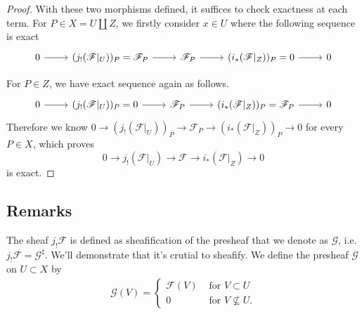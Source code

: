 \begin{proof}
With these two morphisms defined, it suffices to check exactness at each term. 
For $P\in X=U\amalg Z$, we firstly consider $x\in U$ where the following sequence is exact 
\[\begin{tikzcd}
	0 & {(j_!(\mathscr F\vert_U))_P=\mathscr F_P} & {\mathscr F_P} & {(i_{\ast}(\mathscr F\vert_Z))_P=0} & 0
	\arrow[from=1-1, to=1-2]
	\arrow[from=1-2, to=1-3]
	\arrow[from=1-3, to=1-4]
	\arrow[from=1-4, to=1-5]
\end{tikzcd}\]

For $P\in Z$, we have exact sequence again as follows.
\[\begin{tikzcd}
	0 & {(j_!(\mathscr F\vert_U))_P=0} & {\mathscr F_P} & {(i_{\ast}(\mathscr F\vert_Z))_P=\mathscr F_P} & 0
	\arrow[from=1-1, to=1-2]
	\arrow[from=1-2, to=1-3]
	\arrow[from=1-3, to=1-4]
	\arrow[from=1-4, to=1-5]
\end{tikzcd}\]
Therefore we know $0\to (j_!(\mathscr F\vert_U))_P\to \mathscr F_P\to (i_{\ast}(\mathscr F\vert_Z))_P\to 0$ for every $P\in X$, which proves 
\[0\to j_!(\mathscr F\vert_U)\to \mathscr F\to i_{\ast}(\mathscr F\vert_Z)\to 0\] is exact.
\end{proof}

\subsection{Remarks}

The sheaf $j_{!}\mathscr F$ is defined as sheafification of the presheaf that we denote as $\mathscr G$, i.e. $j_{!}\mathscr F=\mathscr G^{\sharp}$. We'll demonstrate that it's crutial to sheafify. We define the presheaf $\mathscr G$ on $U\subset X$ by 
\begin{align*}
    \mathscr G(V)=\begin{cases}
        \mathscr F(V) & \text{ for } V\subset U \\
        0 & \text{ for } V\not\subseteq U.
    \end{cases}
\end{align*}

